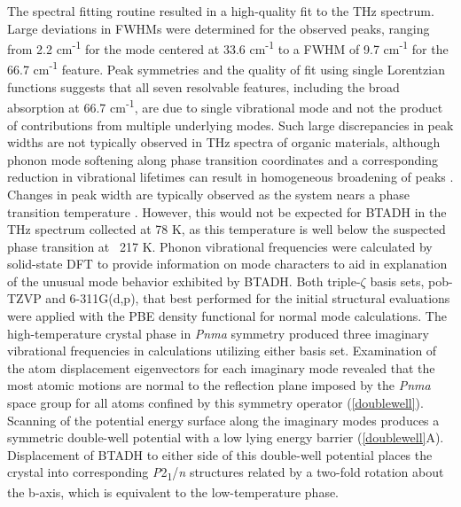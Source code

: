 \par The spectral fitting routine resulted in a high-quality fit to the THz spectrum. Large deviations in FWHMs were determined for the observed peaks, ranging from 2.2 cm\textsuperscript{-1} for the mode centered at 33.6 cm\textsuperscript{-1} to a FWHM of 9.7 cm\textsuperscript{-1} for the 66.7 cm\textsuperscript{-1} feature. Peak symmetries and the quality of fit using single Lorentzian functions suggests that all seven resolvable features, including the broad absorption at 66.7 cm\textsuperscript{-1}, are due to single vibrational mode and not the product of contributions from multiple underlying modes. Such large discrepancies in peak widths are not typically observed in THz spectra of organic materials, although phonon mode softening along phase transition coordinates and a corresponding reduction in vibrational lifetimes can result in homogeneous broadening of peaks \citep{leguy_dynamic_2016,2008_Correa}. Changes in peak width are typically observed as the system nears a phase transition temperature \citep{la-o-vorakiat_phonon_2016}. However, this would not be expected for BTADH in the THz spectrum collected at 78 K, as this temperature is well below the suspected phase transition at ~217 K. 
Phonon vibrational frequencies were calculated by solid-state DFT to provide information on mode characters to aid in explanation of the unusual mode behavior exhibited by BTADH. Both triple-\(\zeta\) basis sets, pob-TZVP and 6-311G(d,p), that best performed for the initial structural evaluations were applied with the PBE density functional for normal mode calculations. The high-temperature crystal phase in \textit{Pnma} symmetry produced three imaginary vibrational frequencies in calculations utilizing either basis set. Examination of the atom displacement eigenvectors for each imaginary mode revealed that the most atomic motions are normal to the reflection plane imposed by the \textit{Pnma} space group for all atoms confined by this symmetry operator (\autoref{doublewell}). Scanning of the potential energy surface along the imaginary modes produces a symmetric double-well potential with a low lying energy barrier (\autoref{doublewell}A). Displacement of BTADH to either side of this double-well potential places the crystal into corresponding \textit{P}2\textsubscript{1}/\textit{n} structures related by a two-fold rotation about the b-axis, which is equivalent to the low-temperature phase. 
\newpage
